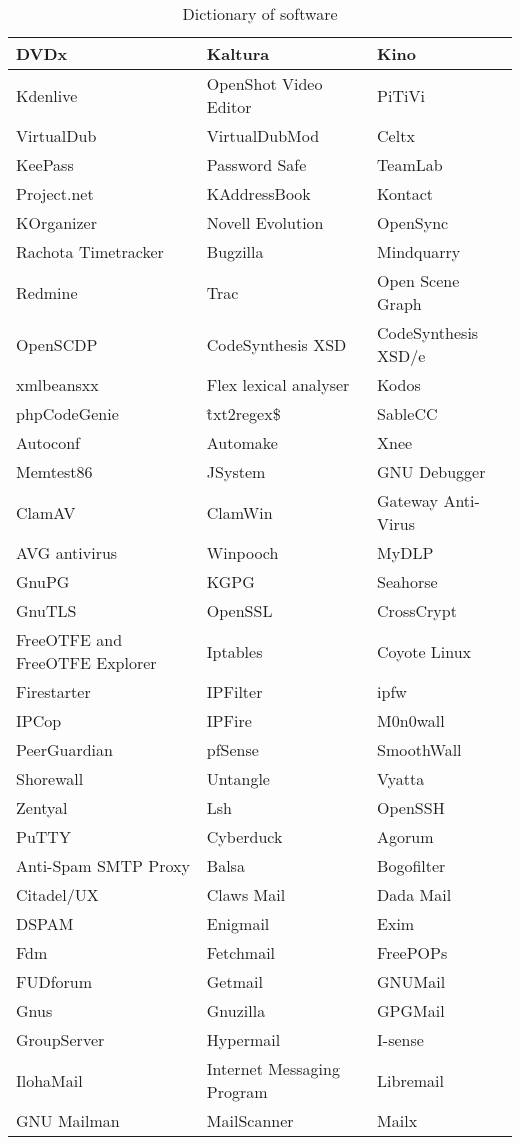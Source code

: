 \begin{table}
\begin{center}
\begin{tabular}{|l|l|l|}\hline
DVDx&Kaltura&Kino\\\hline
Kdenlive&OpenShot Video Editor&PiTiVi\\\hline
VirtualDub&VirtualDubMod&Celtx\\\hline
KeePass&Password Safe&TeamLab\\\hline
Project.net&KAddressBook&Kontact\\\hline
KOrganizer&Novell Evolution&OpenSync\\\hline
Rachota Timetracker&Bugzilla&Mindquarry\\\hline
Redmine&Trac&Open Scene Graph\\\hline
OpenSCDP&CodeSynthesis XSD&CodeSynthesis XSD/e\\\hline
xmlbeansxx&Flex lexical analyser&Kodos\\\hline
phpCodeGenie&\^txt2regex\$&SableCC\\\hline
Autoconf&Automake&Xnee\\\hline
Memtest86&JSystem&GNU Debugger\\\hline
ClamAV&ClamWin&Gateway Anti-Virus\\\hline
AVG antivirus&Winpooch&MyDLP\\\hline
GnuPG&KGPG&Seahorse\\\hline
GnuTLS&OpenSSL&CrossCrypt\\\hline
FreeOTFE and FreeOTFE Explorer&Iptables&Coyote Linux\\\hline
Firestarter&IPFilter&ipfw\\\hline
IPCop&IPFire&M0n0wall\\\hline
PeerGuardian&pfSense&SmoothWall\\\hline
Shorewall&Untangle&Vyatta\\\hline
Zentyal&Lsh&OpenSSH\\\hline
PuTTY&Cyberduck&Agorum\\\hline
Anti-Spam SMTP Proxy&Balsa&Bogofilter\\\hline
Citadel/UX&Claws Mail&Dada Mail\\\hline
DSPAM&Enigmail&Exim\\\hline
Fdm&Fetchmail&FreePOPs\\\hline
FUDforum&Getmail&GNUMail\\\hline
Gnus&Gnuzilla&GPGMail\\\hline
GroupServer&Hypermail&I-sense\\\hline
IlohaMail&Internet Messaging Program&Libremail\\\hline
GNU Mailman&MailScanner&Mailx\\\hline
\end{tabular}
\end{center}
\caption{Dictionary of software}
\end{table}


